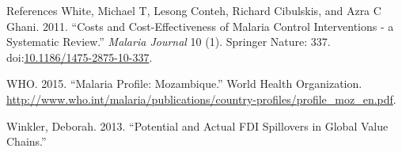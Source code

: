 \documentclass[ignorenonframetext,]{beamer}
\begin{document}
\begin{frame}[allowframebreaks]{References}
\hypertarget{ref-White_2011}{}
White, Michael T, Lesong Conteh, Richard Cibulskis, and Azra C Ghani.
2011. ``Costs and Cost-Effectiveness of Malaria Control Interventions -
a Systematic Review.'' \emph{Malaria Journal} 10 (1). Springer Nature:
337.
doi:\href{https://doi.org/10.1186/1475-2875-10-337}{10.1186/1475-2875-10-337}.

\hypertarget{ref-whoprof}{}
WHO. 2015. ``Malaria Profile: Mozambique.'' World Health Organization.
\url{http://www.who.int/malaria/publications/country-profiles/profile_moz_en.pdf}.

\hypertarget{ref-Winkler}{}
Winkler, Deborah. 2013. ``Potential and Actual FDI Spillovers in Global
Value Chains.''

\end{frame}
\end{document}
